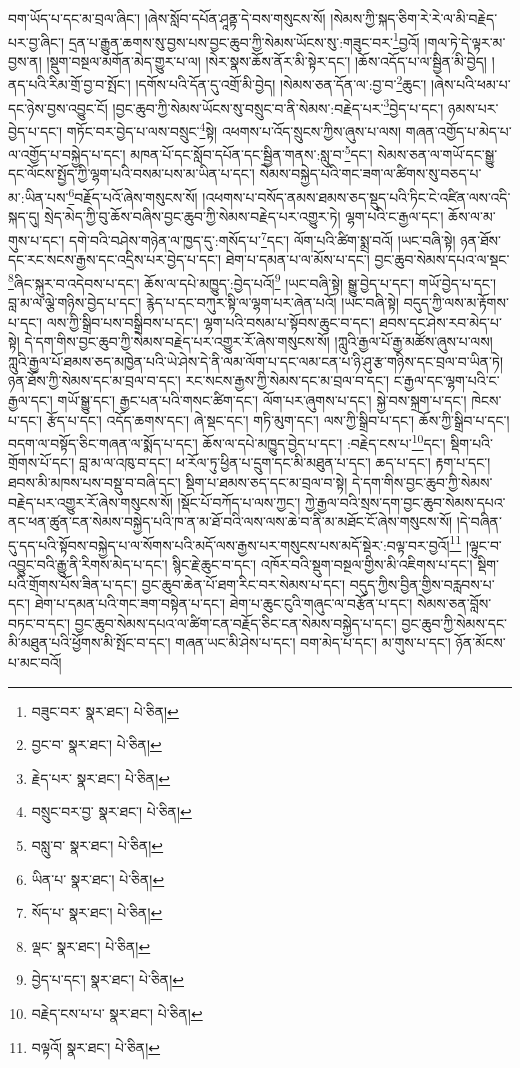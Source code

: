 བག་ཡོད་པ་དང་མ་བྲལ་ཞིང་། །ཞེས་སློབ་དཔོན་ཤཱནྟ་དེ་བས་གསུངས་སོ། །སེམས་ཀྱི་སྐད་ཅིག་རེ་རེ་ལ་མི་བརྗེད་པར་བྱ་ཞིང་། དྲན་པ་རྒྱུན་ཆགས་སུ་བྱས་པས་བྱང་ཆུབ་ཀྱི་སེམས་ཡོངས་སུ་:གཟུང་བར་\footnote{བཟུང་བར་  སྣར་ཐང་།  པེ་ཅིན། }བྱའོ། །གལ་ཏེ་དེ་ལྟར་མ་བྱས་ན། །སྡུག་བསྔལ་མགོན་མེད་གྱུར་པ་ལ། །སེར་སྣས་ཆོས་ནོར་མི་སྟེར་དང་། །ཆོས་འདོད་པ་ལ་སྦྱིན་མི་བྱེད། །ནད་པའི་རིམ་གྲོ་བྱ་བ་སྤོང་། །དགོས་པའི་དོན་དུ་འགྲོ་མི་བྱེད། །སེམས་ཅན་དོན་ལ་:བྱ་བ་\footnote{བྱང་བ་  སྣར་ཐང་།  པེ་ཅིན། }ཆུང་། །ཞེས་པའི་ཕམ་པ་དང་ཉེས་བྱས་འབྱུང་ངོ། །བྱང་ཆུབ་ཀྱི་སེམས་ཡོངས་སུ་བསྲུང་བ་ནི་སེམས་:བརྗེད་པར་\footnote{རྗེད་པར་  སྣར་ཐང་།  པེ་ཅིན། }བྱེད་པ་དང་། ཉམས་པར་བྱེད་པ་དང་། གཏོང་བར་བྱེད་པ་ལས་བསྲུང་\footnote{བསྲུང་བར་བྱ་  སྣར་ཐང་།  པེ་ཅིན། }སྟེ། འཕགས་པ་འོད་སྲུངས་ཀྱིས་ཞུས་པ་ལས། གཞན་འགྱོད་པ་མེད་པ་ལ་འགྱོད་པ་བསྐྱེད་པ་དང་། མཁན་པོ་དང་སློབ་དཔོན་དང་སྦྱིན་གནས་:སླུ་བ་\footnote{བསླུ་བ་  སྣར་ཐང་།  པེ་ཅིན། }དང་། སེམས་ཅན་ལ་གཡོ་དང་སྒྱུ་དང་ལོངས་སྤྱོད་ཀྱི་ལྷག་པའི་བསམ་པས་མ་ཡིན་པ་དང་། སེམས་བསྐྱེད་པའི་གང་ཟག་ལ་ཚིགས་སུ་བཅད་པ་མ་:ཡིན་པས་\footnote{ཡིན་པ་  སྣར་ཐང་།  པེ་ཅིན། }བརྗོད་པའོ་ཞེས་གསུངས་སོ། །འཕགས་པ་བསོད་ནམས་ཐམས་ཅད་སྡུད་པའི་ཏིང་ངེ་འཛིན་ལས་འདི་སྐད་དུ། སྲེད་མེད་ཀྱི་བུ་ཆོས་བཞིས་བྱང་ཆུབ་ཀྱི་སེམས་བརྗེད་པར་འགྱུར་ཏེ། ལྷག་པའི་ང་རྒྱལ་དང་། ཆོས་ལ་མ་གུས་པ་དང་། དགེ་བའི་བཤེས་གཉེན་ལ་ཁྱད་དུ་:གསོད་པ་\footnote{སོད་པ་  སྣར་ཐང་།  པེ་ཅིན། }དང་། ལོག་པའི་ཚིག་སྨྲ་བའོ། །ཡང་བཞི་སྟེ། ཉན་ཐོས་དང་རང་སངས་རྒྱས་དང་འདྲིས་པར་བྱེད་པ་དང་། ཐེག་པ་དམན་པ་ལ་མོས་པ་དང་། བྱང་ཆུབ་སེམས་དཔའ་ལ་སྡང་\footnote{ལྡང་  སྣར་ཐང་།  པེ་ཅིན། }ཞིང་སྐུར་བ་འདེབས་པ་དང་། ཆོས་ལ་དཔེ་མཁྱུད་:བྱེད་པའོ།\footnote{བྱེད་པ་དང་།  སྣར་ཐང་།  པེ་ཅིན། } །ཡང་བཞི་སྟེ། སྒྱུ་བྱེད་པ་དང་། གཡོ་བྱེད་པ་དང་། བླ་མ་ལ་ལྕེ་གཉིས་བྱེད་པ་དང་། རྙེད་པ་དང་བཀུར་སྟི་ལ་ལྷག་པར་ཞེན་པའོ། །ཡང་བཞི་སྟེ། བདུད་ཀྱི་ལས་མ་རྟོགས་པ་དང་། ལས་ཀྱི་སྒྲིབ་པས་བསྒྲིབས་པ་དང་། ལྷག་པའི་བསམ་པ་སྟོབས་ཆུང་བ་དང་། ཐབས་དང་ཤེས་རབ་མེད་པ་སྟེ། དེ་དག་གིས་བྱང་ཆུབ་ཀྱི་སེམས་བརྗེད་པར་འགྱུར་རོ་ཞེས་གསུངས་སོ། །ཀླུའི་རྒྱལ་པོ་རྒྱ་མཚོས་ཞུས་པ་ལས། ཀླུའི་རྒྱལ་པོ་ཐམས་ཅད་མཁྱེན་པའི་ཡེ་ཤེས་དེ་ནི་ལམ་ལོག་པ་དང་ལམ་ངན་པ་ཉི་ཤུ་རྩ་གཉིས་དང་བྲལ་བ་ཡིན་ཏེ། ཉན་ཐོས་ཀྱི་སེམས་དང་མ་བྲལ་བ་དང་། རང་སངས་རྒྱས་ཀྱི་སེམས་དང་མ་བྲལ་བ་དང་། ང་རྒྱལ་དང་ལྷག་པའི་ང་རྒྱལ་དང་། གཡོ་སྒྱུ་དང་། རྒྱང་པན་པའི་གསང་ཚིག་དང་། ལོག་པར་ཞུགས་པ་དང་། སྐྱེ་བས་སྐྲག་པ་དང་། ཁེངས་པ་དང་། རྩོད་པ་དང་། འདོད་ཆགས་དང་། ཞེ་སྡང་དང་། གཏི་མུག་དང་། ལས་ཀྱི་སྒྲིབ་པ་དང་། ཆོས་ཀྱི་སྒྲིབ་པ་དང་། བདག་ལ་བསྟོད་ཅིང་གཞན་ལ་སྨོད་པ་དང་། ཆོས་ལ་དཔེ་མཁྱུད་བྱེད་པ་དང་། :བརྗེད་ངས་པ་\footnote{བརྗེད་ངས་པ་པ་  སྣར་ཐང་།  པེ་ཅིན། }དང་། སྡིག་པའི་གྲོགས་པོ་དང་། བླ་མ་ལ་འཁུ་བ་དང་། ཕ་རོལ་ཏུ་ཕྱིན་པ་དྲུག་དང་མི་མཐུན་པ་དང་། ཆད་པ་དང་། རྟག་པ་དང་། ཐབས་མི་མཁས་པས་བསྡུ་བ་བཞི་དང་། སྡིག་པ་ཐམས་ཅད་དང་མ་བྲལ་བ་སྟེ། དེ་དག་གིས་བྱང་ཆུབ་ཀྱི་སེམས་བརྗེད་པར་འགྱུར་རོ་ཞེས་གསུངས་སོ། །སྡོང་པོ་བཀོད་པ་ལས་ཀྱང་། ཀྱེ་རྒྱལ་བའི་སྲས་དག་བྱང་ཆུབ་སེམས་དཔའ་ནང་ཕན་ཚུན་ངན་སེམས་བསྐྱེད་པའི་ཁ་ན་མ་ཐོ་བའི་ལས་ལས་ཆེ་བ་ནི་མ་མཐོང་ངོ་ཞེས་གསུངས་སོ། །དེ་བཞིན་དུ་དད་པའི་སྟོབས་བསྐྱེད་པ་ལ་སོགས་པའི་མདོ་ལས་རྒྱས་པར་གསུངས་པས་མདོ་སྡེར་:བལྟ་བར་བྱའོ།\footnote{བལྟའོ།  སྣར་ཐང་།  པེ་ཅིན། } །ལྟུང་བ་འབྱུང་བའི་རྒྱུ་ནི་རིགས་མེད་པ་དང་། སྙིང་རྗེ་ཆུང་བ་དང་། འཁོར་བའི་སྡུག་བསྔལ་གྱིས་མི་འཇིགས་པ་དང་། སྡིག་པའི་གྲོགས་པོས་ཟིན་པ་དང་། བྱང་ཆུབ་ཆེན་པོ་ཐག་རིང་བར་སེམས་པ་དང་། བདུད་ཀྱིས་བྱིན་གྱིས་བརླབས་པ་དང་། ཐེག་པ་དམན་པའི་གང་ཟག་བསྟེན་པ་དང་། ཐེག་པ་ཆུང་ངུའི་གཞུང་ལ་བརྩོན་པ་དང་། སེམས་ཅན་བློས་བཏང་བ་དང་། བྱང་ཆུབ་སེམས་དཔའ་ལ་ཚིག་ངན་བརྗོད་ཅིང་ངན་སེམས་བསྐྱེད་པ་དང་། བྱང་ཆུབ་ཀྱི་སེམས་དང་མི་མཐུན་པའི་ཕྱོགས་མི་སྤོང་བ་དང་། གཞན་ཡང་མི་ཤེས་པ་དང་། བག་མེད་པ་དང་། མ་གུས་པ་དང་། ཉོན་མོངས་པ་མང་བའོ། 